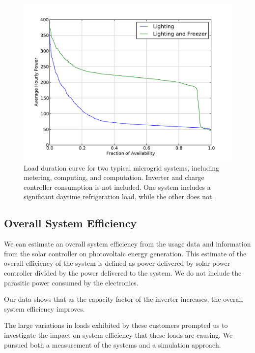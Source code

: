 \documentclass[conference]{IEEEtran}
\begin{document}
\begin{figure}[h]
\begin{center}
\includegraphics[trim = 0.0in 0.2in 0.0in 0.5in, clip, width=\columnwidth]{figures/two_ldc.pdf}
\end{center}
\caption{Load duration curve for two typical microgrid systems,
including metering, computing, and computation.
Inverter and charge controller consumption is not included.
One system includes a significant daytime refrigeration load,
while the other does not.
}
\label{two_ldc}
\end{figure}

\subsection{Overall System Efficiency}

We can estimate an overall system efficiency from the
usage data and information from the solar controller
on photovoltaic energy generation.
This estimate of the overall efficiency of the system
is defined as power delivered by solar
power controller divided by the power delivered to the system.
We do not include the parasitic power consumed by the electronics.

Our data shows that as the capacity factor of the inverter
increases, the overall system efficiency improves.

The large variations in loads exhibited by these customers prompted
us to investigate the impact on system efficiency that these
loads are causing.
We pursued both a measurement of the systems and a simulation approach.
\end{document}
